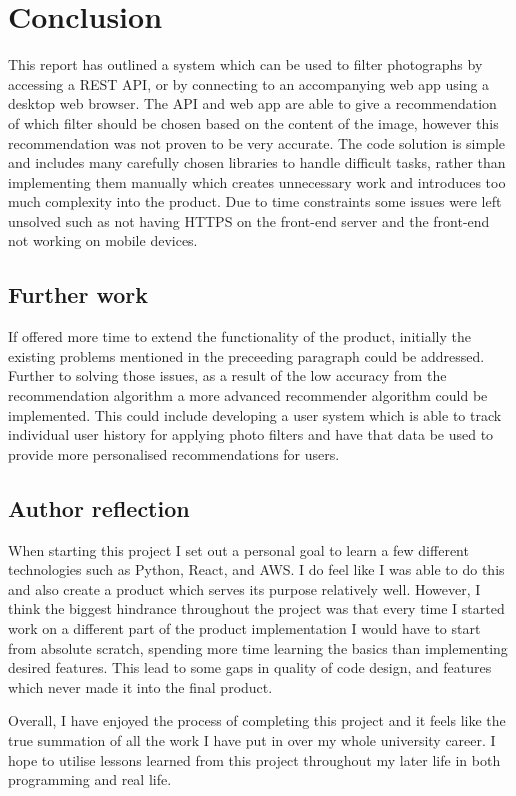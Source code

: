 \documentclass[a4paper,12pt]{report}
\begin{document}
\chapter{Conclusion}
  This report has outlined a system which can be used to filter photographs by accessing a REST API, or by connecting to an accompanying web app using a desktop web browser. The API and web app are able to give a recommendation of which filter should be chosen based on the content of the image, however this recommendation was not proven to be very accurate. The code solution is simple and includes many carefully chosen libraries to handle difficult tasks, rather than implementing them manually which creates unnecessary work and introduces too much complexity into the product. Due to time constraints some issues were left unsolved such as not having HTTPS on the front-end server and the front-end not working on mobile devices.

  \newpage
  \section{Further work}
    If offered more time to extend the functionality of the product, initially the existing problems mentioned in the preceeding paragraph could be addressed. Further to solving those issues, as a result of the low accuracy from the recommendation algorithm a more advanced recommender algorithm could be implemented. This could include developing a user system which is able to track individual user history for applying photo filters and have that data be used to provide more personalised recommendations for users.

  \section{Author reflection}
    When starting this project I set out a personal goal to learn a few different technologies such as Python, React, and AWS. I do feel like I was able to do this and also create a product which serves its purpose relatively well. However, I think the biggest hindrance throughout the project was that every time I started work on a different part of the product implementation I would have to start from absolute scratch, spending more time learning the basics than implementing desired features. This lead to some gaps in quality of code design, and features which never made it into the final product.

    Overall, I have enjoyed the process of completing this project and it feels like the true summation of all the work I have put in over my whole university career. I hope to utilise lessons learned from this project throughout my later life in both programming and real life.

\newpage
\singlespacing



\end{document}
